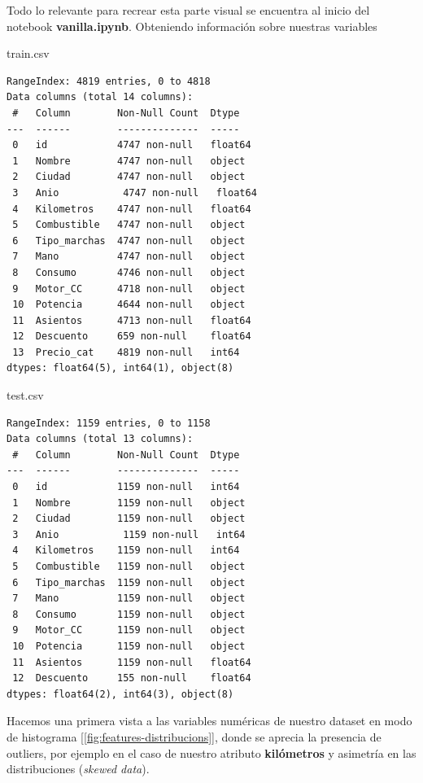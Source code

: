 \documentclass[12pt,twoside]{report}
\begin{document}
Todo lo relevante para recrear esta parte visual se encuentra al inicio del notebook \textbf{vanilla.ipynb}. Obteniendo información sobre nuestras variables

\begin{multicols}{2}
train.csv
\begin{lstlisting}
RangeIndex: 4819 entries, 0 to 4818
Data columns (total 14 columns):
 #   Column        Non-Null Count  Dtype  
---  ------        --------------  -----  
 0   id            4747 non-null   float64
 1   Nombre        4747 non-null   object 
 2   Ciudad        4747 non-null   object 
 3   Anio           4747 non-null   float64
 4   Kilometros    4747 non-null   float64
 5   Combustible   4747 non-null   object 
 6   Tipo_marchas  4747 non-null   object 
 7   Mano          4747 non-null   object 
 8   Consumo       4746 non-null   object 
 9   Motor_CC      4718 non-null   object 
 10  Potencia      4644 non-null   object 
 11  Asientos      4713 non-null   float64
 12  Descuento     659 non-null    float64
 13  Precio_cat    4819 non-null   int64  
dtypes: float64(5), int64(1), object(8)
\end{lstlisting}
\columnbreak
test.csv
\begin{lstlisting}
RangeIndex: 1159 entries, 0 to 1158
Data columns (total 13 columns):
 #   Column        Non-Null Count  Dtype  
---  ------        --------------  -----  
 0   id            1159 non-null   int64  
 1   Nombre        1159 non-null   object 
 2   Ciudad        1159 non-null   object 
 3   Anio           1159 non-null   int64  
 4   Kilometros    1159 non-null   int64  
 5   Combustible   1159 non-null   object 
 6   Tipo_marchas  1159 non-null   object 
 7   Mano          1159 non-null   object 
 8   Consumo       1159 non-null   object 
 9   Motor_CC      1159 non-null   object 
 10  Potencia      1159 non-null   object 
 11  Asientos      1159 non-null   float64
 12  Descuento     155 non-null    float64
dtypes: float64(2), int64(3), object(8)
\end{lstlisting}
\end{multicols}

Hacemos una primera vista a las variables numéricas de nuestro dataset en modo de histograma [\ref{fig:features-distribucions}], donde se aprecia la presencia de outliers, por ejemplo en el caso de nuestro atributo \textbf{kilómetros} y asimetría en las distribuciones (\textit{skewed data}).
\end{document}
